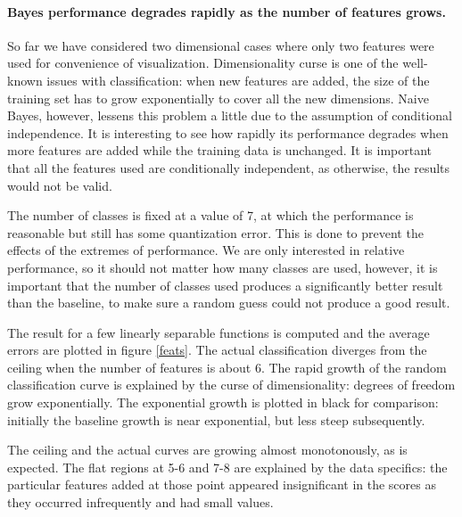 \documentclass[12pt,notitlepage,twoside]{scrreprt}
\begin{document}
\paragraph{Bayes performance degrades rapidly as the number of features grows.}
So far we have considered two dimensional cases where only two features were used for
convenience of visualization. Dimensionality curse is one of the well-known issues with
classification: when new features are added, the size of the training set has to grow
exponentially to cover all the new dimensions. Naive Bayes, however, lessens this problem
a little due to the assumption of conditional independence. It is interesting to see how
rapidly its performance degrades when more features are added while the training data is
unchanged. It is important that all the features used are conditionally independent, as
otherwise, the results would not be valid. 

The number of classes is fixed at a value of 7, at which the performance is reasonable but
still has some quantization error. This is done to prevent the effects of the extremes of
performance. We are only interested in relative performance, so it should not matter how
many classes are used, however, it is important that the number of classes used produces a
significantly better result than the baseline, to make sure a random guess could not
produce a good result.

The result for a few linearly separable functions is computed and the average errors are
plotted in figure \ref{feats}. The actual classification diverges from the ceiling when
the number of features is about 6. The rapid growth of the random classification curve is
explained by the curse of dimensionality: degrees of freedom grow exponentially. The
exponential growth is plotted in black for comparison: initially the baseline growth is
near exponential, but less steep subsequently. 

The ceiling and the actual curves are growing almost monotonously, as is expected. The
flat regions at 5-6 and 7-8 are explained by the data specifics: the particular features added at
those point appeared insignificant in the scores as they occurred infrequently and had
small values.
\end{document}
